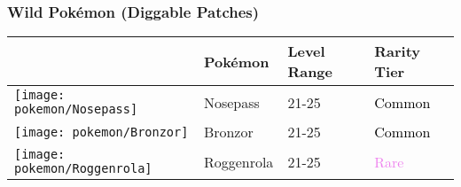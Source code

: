 \subsubsection{Wild Pokémon (Diggable Patches)}%
\label{ssubsec:WildPokmon(DiggablePatches)}%
\begin{longtable}{||l l l l||}%
\hline%
&Pokémon&Level Range&Rarity Tier\\%
\hline%
\endhead%
\hline%
\texttt{[image: pokemon/Nosepass]}&Nosepass&21{-}25&\textcolor{black}{%
Common%
}\\%
\hline%
\texttt{[image: pokemon/Bronzor]}&Bronzor&21{-}25&\textcolor{black}{%
Common%
}\\%
\hline%
\texttt{[image: pokemon/Roggenrola]}&Roggenrola&21{-}25&\textcolor{violet}{%
Rare%
}\\%
\hline%
\end{longtable}%
\caption{Wild Pokemon in Ravaged Path (Diggable Patches)}